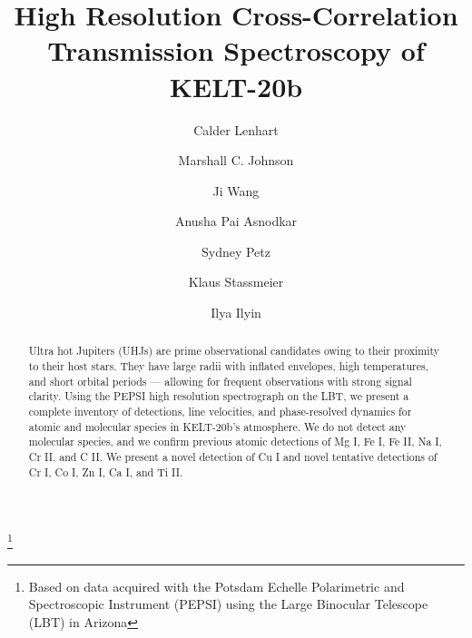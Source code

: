 \documentclass[twocolumn]{aastex631}
\begin{document}
    \title{High Resolution Cross-Correlation Transmission Spectroscopy of KELT-20b}\footnote{Based on data acquired with the Potsdam Echelle Polarimetric and Spectroscopic Instrument (PEPSI) using the Large Binocular Telescope (LBT) in Arizona}

    \author[0009-0001-1459-3738]{Calder Lenhart}

    \author[0000-0002-5099-8185]{Marshall C. Johnson}

    \author{Ji Wang}

    \author[0000-0002-8823-8237]{Anusha Pai Asnodkar}

    \author{Sydney Petz}

    \author[0000-0002-6192-6494]{Klaus Stassmeier}

    \author[0000-0002-0551-046X]{Ilya Ilyin}


    \begin{abstract}
        Ultra hot Jupiters (UHJs) are prime observational candidates owing to their proximity to their host stars. They have large radii with inflated envelopes, high temperatures, and short orbital periods --- allowing for frequent observations with strong signal clarity. Using the PEPSI high resolution spectrograph on the LBT, we present a complete inventory of detections, line velocities, and phase-resolved dynamics for atomic and molecular species in KELT-20b's atmosphere. We do not detect any molecular species, and we confirm previous atomic detections of Mg I, Fe I, Fe II, Na I, Cr II, and C II. We present a novel detection of Cu I and novel tentative detections of Cr I, Co I, Zn I, Ca I, and Ti II.
    \end{abstract}
\end{document}
